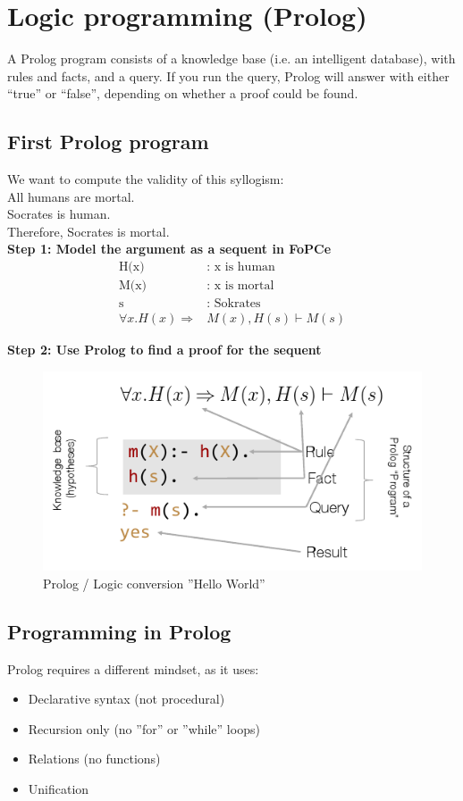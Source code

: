 \section{Logic programming (Prolog)}
A Prolog program consists of a knowledge base (i.e. an intelligent database), with rules and facts, and a query.
If you run the query, Prolog will answer with either “true” or “false”, depending on whether a proof could be found.
\subsection{First Prolog program}
We want to compute the validity of this syllogism: \\
All humans are mortal. \\
Socrates is human. \\
Therefore, Socrates is mortal.\\

\textbf{Step 1: Model the argument as a sequent in FoPCe}
\begin{align*}
	\text{H(x)}&\text{: x is human}\\
	\text{M(x)}&\text{: x is mortal}\\
	\text{s}&\text{: Sokrates}\\
	\forall x.H(x) \Rightarrow& M(x),H(s) \vdash M(s)
\end{align*}

\textbf{Step 2: Use Prolog to find a proof for the sequent}

\begin{figure}[H]
\centering
\includegraphics[width=0.6\linewidth]{images/prolog_logic_conversion}
\caption{Prolog / Logic conversion ''Hello World''}
\label{fig:prologlogicconversion}
\end{figure}

\subsection{Programming in Prolog}
Prolog requires a different mindset, as it uses:
\begin{itemize}
	\item Declarative syntax (not procedural)
	\item Recursion only (no ''for'' or ''while'' loops)
	\item Relations (no functions)
	\item Unification
\end{itemize}


